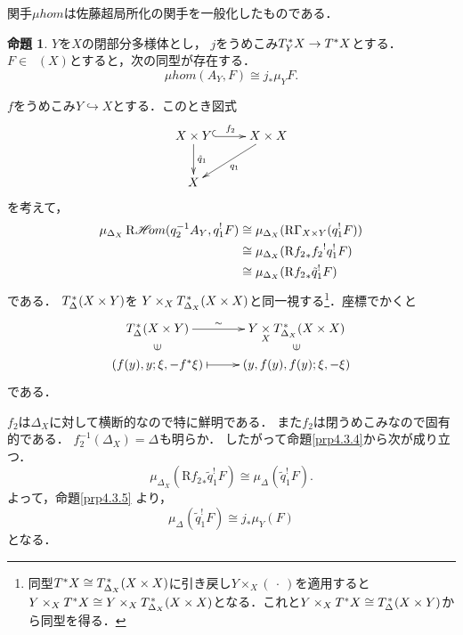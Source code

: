 \documentclass[leqno, 10pt, a4paper, dvipdfmx]{jsarticle}
\makeatletter
\theoremstyle{definition}
\renewenvironment{proof}[1][\proofname]{\par
  \pushQED{\qed}%
  \normalfont \topsep6\p@\@plus6\p@\relax
  \trivlist
  \item[\hskip\labelsep
         \bfseries
    {#1}]\ignorespaces
}{%
  \popQED\endtrivlist\@endpefalse
}
\renewcommand{\proofname}{証明.}
\numberwithin{equation}{section}
\newcommand{\Dompb}{\mathop{\mathsf{D}^\mathrm{b}}\nolimits}
\newcommand{\HOM}{\mathop{\mathscr{H}\hspace{-2pt}om}\nolimits}%
\newcommand{\RHOM}{\mathop{\mathrm{R}\hspace{-1.5pt}\HOM}\nolimits}
\newcommand{\RG}{\mathop{\mathrm{R}\hspace{-0pt}\Gamma}\nolimits}
\newcommand{\Rder}{\mathrm{R}}
\newcommand{\blk}{\mathord{\ \cdot\ }}
\newcommand{\dpb}[1][]{\mathbin{\mathop{\times}\limits_{#1}}}
\newcommand{\tpb}[1][]{\mathbin{\mathop{\times}\nolimits_{#1}}}
\theoremstyle{mystyle}
\newtheorem{PRP}[AXM]{命題}
\renewenvironment{leftbar}{%
  \def\FrameCommand{\textcolor{lightgray}{\vrule width 4pt} \hspace{10pt}}%
  \MakeFramed {\advance\hsize-\width \FrameRestore}}%
{\endMakeFramed}
\newcommand{\cotb}[1][]{T^{\ast}{#1}}
\newcommand{\conm}[2][]{T_{#1}^{\hspace{0.7pt}\ast}{#2}}
\newcommand{\muhom}{\mu hom}
\newcommand{\diag}[1][]{\Delta_{#1}}
\makeatother
\begin{document}
関手\(\muhom\)は佐藤超局所化の関手を一般化したものである．

\begin{leftbar}
\begin{PRP}
  \(Y\)を\(X\)の閉部分多様体とし，
  \(j\)をうめこみ\(\conm[Y]{X}\to \cotb[X]\)とする．
  \(F\in\Dompb(X)\)とすると，次の同型が存在する．
  \[
    \muhom(A_Y,F)\cong j_{\ast}\mu_{Y}F.
  \]
\end{PRP}
\end{leftbar}
\begin{proof}
  \(f\)をうめこみ\(Y\hookrightarrow X\)とする．このとき図式\[
  \vcenter{\xymatrix{
      X\times Y
      \ar@{^{(}->}[r]^-{f_2}
      \ar[d]^-{\tilde{q}_1}
      &
      X\times X
      \ar[ld]^-{q_1}
      \\
      X
  }}\]を考えて，
  \begin{align*}
    \mu_{\diag[X]}\RHOM(q_2^{-1}A_{Y},q_1^!F)
    &\cong
    \mu_{\diag[X]}(\RG_{X\times Y}(q_1^!F))\\
    &\cong
    \mu_{\diag[X]}(\Rder{{f_2}_{\ast}}{f_2}^{!}q_1^!F)\\
    &\cong
    \mu_{\diag[X]}(\Rder{{f_2}_{\ast}}\tilde{q}_{1}^{!}F)
  \end{align*}
  である．
  \(\conm[{\diag[]}]{(X\times Y)}\)を
  \(
    Y\tpb[X]\conm[{\diag[X]}]{(X\times X)}
  \)と同一視する\footnote{
    同型\(\cotb[X]\cong\conm[{\diag[X]}]{(X\times X)}\)に引き戻し\(Y\tpb[X](\blk)\)を適用すると
    \(
      Y\tpb[X]\cotb[X]
      \cong 
      Y\tpb[X]\conm[{\diag[X]}]{(X\times X)}
    \)となる．これと\(
      Y\tpb[X]\cotb[X]
      \cong 
      \conm[{\diag[]}]{(X\times Y)}
    \)から同型を得る．
  }．座標でかくと\[    
    \vcenter{\xymatrix@C=26pt@R=10pt{
      \conm[{\diag[]}]{(X\times Y)}
      \ar[r]^-{\sim}
      &
      Y\dpb[X]\conm[{\diag[X]}]{(X\times X)}
      \\
      \left(f(y),y;\xi,-f^{\ast}\xi\right)
      \ar@{}[u]|{\rotatebox{90}{\(\in\)}}
      \ar@{{|}->}[r]_-{}
      &
      \ar@{}[u]|{\rotatebox{90}{\(\in\)}}
      \left(y,f(y),f(y);\xi,-\xi\right)
    }}
  \]である．

  \(f_2\)は\(\diag[X]\)に対して横断的なので特に鮮明である．
  また\(f_2\)は閉うめこみなので固有的である．
  \(f_2^{-1}(\diag[X])=\diag[]\)も明らか．
  したがって命題\ref{prp4.3.4}から次が成り立つ．
  \[
    \mu_{\diag[X]}(\Rder{{f_2}_{\ast}}\tilde{q}_{1}^{!}F)
    \cong
    \mu_{\diag[]}(\tilde{q}_{1}^{!}F).
  \]
  よって，命題\ref{prp4.3.5}
  より，\[
    \mu_{\diag[]}(\tilde{q}_{1}^{!}F)
    \cong
    j_{\ast}\mu_{Y}(F)
  \]
  となる．
\end{proof}
\end{document}
